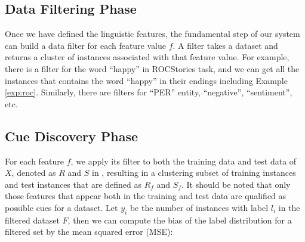%


\subsection{Data Filtering Phase}
\label{sec:evaldata}
Once we have defined the linguistic features, the fundamental step of our system 
can build a data filter for
each feature value $f$. 
A filter takes a dataset and returns
a cluster of instances associated with that feature value. For example,
there is a filter for the word ``happy'' in ROCStories task,
and we can get all the instances that 
contains the word ``happy'' in their endings including Example \ref{exp:roc}. 
Similarly, there are filters for ``PER'' entity, ``negative'', ``sentiment'', etc. 


\subsection{Cue Discovery Phase}
\label{sec:cuenessdiscovery}
For each feature $f$, we apply its filter to both the training data and test data
of $X$, denoted as $R$ and $S$ in ,
resulting in a clustering subset of training instances and test instances 
that are defined as $R_f$ and $S_f$. 
It should be noted that only those features 
that appear both in the training and test data
are qualified as possible cues for a dataset.
Let $y_i$ be the number of instances with label $l_i$ in the filtered
dataset $F$, then we can compute the bias of the label distribution for a filtered
set by the mean squared error (MSE):

